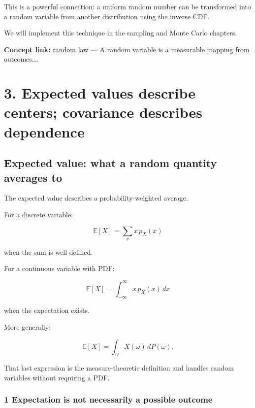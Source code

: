This is a powerful connection: a uniform random number can be transformed into a random variable from another distribution using the inverse CDF.

We will implement this technique in the sampling and Monte Carlo chapters.

\textbf{Concept link:} \hyperref[02-foundations-ii-ch023-random-quantities-and-their-probability-laws]{random law} --- A random variable is a measurable mapping from outcomes\ldots.

\section{3. Expected values describe centers; covariance describes dependence}\label{02-foundations-ii-ch023-expected-values-describe-centers-covariance-describes-dependence}

\hypertarget{02-foundations-ii-ch023-expected-values-describe-centers-covariance-describes-dependence}{}

\subsection{Expected value: what a random quantity averages to}\label{02-foundations-ii-ch023-expected-value-what-a-random-quantity-averages-to}

\hypertarget{02-foundations-ii-ch023-expected-value-what-a-random-quantity-averages-to}{}

The expected value describes a probability-weighted average.

For a discrete variable:

\[
 \boxed{ \mathbb E[X]=\sum_xx\,p_X(x) }
\]

when the sum is well defined.

For a continuous variable with PDF:

\[
 \boxed{ \mathbb E[X]= \int_{-\infty}^{\infty}x\,p_X(x)\,dx }
\]

when the expectation exists.

More generally:

\[
 \mathbb E[X]=\int_\Omega X(\omega)\,dP(\omega).
\]

That last expression is the measure-theoretic definition and handles random variables without requiring a PDF.

\subsubsection{1 Expectation is not necessarily a possible outcome}\label{02-foundations-ii-ch023-expectation-is-not-necessarily-a-possible-outcome}

